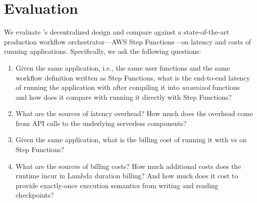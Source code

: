 \section{Evaluation}\label{sec:eval}

We evaluate \name{}'s decentralized design and compare against a
state-of-the-art production workflow orchestrator---AWS Step Functions---on
latency and costs of running applications. Specifically, we ask the following
questions: 

\begin{enumerate}
	
	\item Given the same application, i.e., the same user functions and the
	same workflow definition written as Step Functions, what is the end-to-end
	latency of running the application with \name{} after compiling it into
	\textit{unumized} functions and how does it compare with running it
	directly with Step Functions?
	
	\item What are the sources of  latency overhead? How much does
	the overhead come from API calls to the underlying serverless components?
	
	\item Given the same application, what is the billing cost of running it
	with \name{} vs on Step Functions?
	
	\item What are the sources of  billing costs? How much additional
	costs does the \name{} runtime incur in Lambda duration billing? And how
	much does it cost to provide exactly-once execution semantics from writing
	and reading checkpoints?
	
\end{enumerate}


	
	
	
